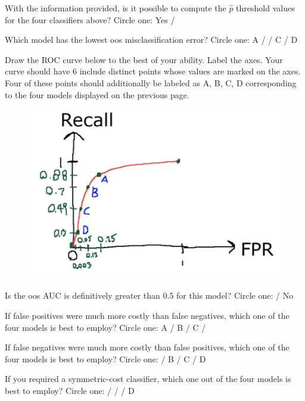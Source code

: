 \documentclass[12pt]{article}
\begin{document}
 With the information provided, is it possible to compute the $\hat{p}$ threshold values for the four classifiers above? Circle one: Yes / 


 Which model has the lowest oos misclassification error? Circle one: A /  / C / D

 Draw the ROC curve below to the best of your ability. Label the axes. Your curve should have 6 include distinct points whose values are marked on the axes. Four of these points should additionally be labeled as A, B, C, D corresponding to the four models displayed on the previous page. 

 
\begin{figure}[htp]
\centering
\includegraphics[width=5in]{roc}
\end{figure} 




 Is the oos AUC is definitively greater than 0.5 for this model? Circle one:  / No

 If false positives were much more costly than false negatives, which one of the four models is best to employ? Circle one: A / B / C / 

 If false negatives were much more costly than false positives, which one of the four models is best to employ? Circle one:  / B / C / D

 If you required a symmetric-cost classifier, which one out of the four models is best to employ? Circle one:  /  /  / D \\
\end{document}
